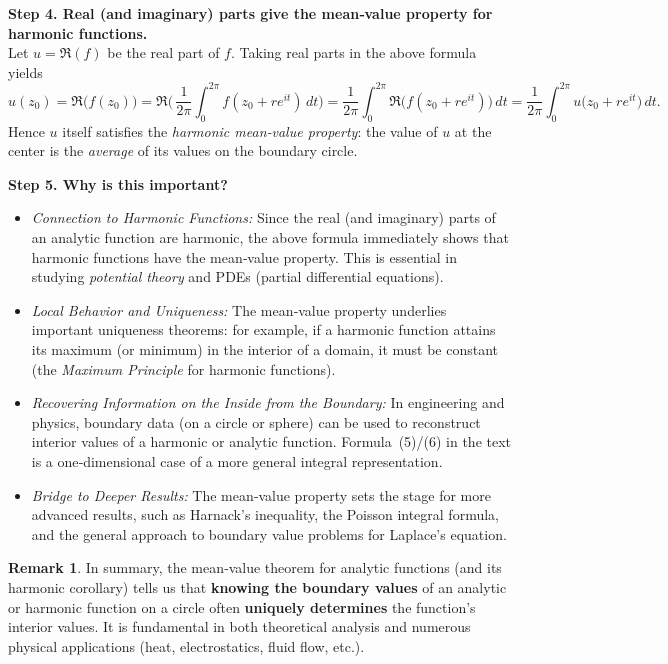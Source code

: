 \documentclass[12pt]{article}
\theoremstyle{definition} %
\newtheorem{remark}{Remark}
\theoremstyle{plain} %
\begin{document}
    \medskip
    
    \noindent
    \textbf{Step 4. Real (and imaginary) parts give the mean‐value property for harmonic functions.}\\
    Let $u = \Re(f)$ be the real part of $f$.  Taking real parts in the above formula yields
    \[
      u(z_0)
      = \Re\bigl(f(z_0)\bigr)
      = \Re\!\biggl(\,\frac{1}{2\pi}\int_{0}^{2\pi} f(z_0 + re^{i t})\, dt\biggr)
      = \frac{1}{2\pi}\int_{0}^{2\pi}
          \Re\bigl(f(z_0 + re^{i t})\bigr)\, dt
      = \frac{1}{2\pi}\int_{0}^{2\pi} u\bigl(z_0 + re^{i t}\bigr)\, dt.
    \]
    Hence $u$ itself satisfies the \emph{harmonic mean‐value property}: 
    the value of $u$ at the center is the \emph{average} of its values on the boundary circle.
    
    \medskip
    
    \noindent
    \textbf{Step 5. Why is this important?}
    \begin{itemize}
    \item \emph{Connection to Harmonic Functions:} 
      Since the real (and imaginary) parts of an analytic function are harmonic, the above formula 
      immediately shows that harmonic functions have the mean‐value property.  This is essential 
      in studying \emph{potential theory} and PDEs (partial differential equations).
    \item \emph{Local Behavior and Uniqueness:} 
      The mean‐value property underlies important uniqueness theorems: for example, if a harmonic 
      function attains its maximum (or minimum) in the interior of a domain, it must be constant 
      (the \emph{Maximum Principle} for harmonic functions).
    \item \emph{Recovering Information on the Inside from the Boundary:} 
      In engineering and physics, boundary data (on a circle or sphere) can be used to reconstruct 
      interior values of a harmonic or analytic function.  Formula~(5)/(6) in the text is a 
      one‐dimensional case of a more general integral representation.
    \item \emph{Bridge to Deeper Results:} 
      The mean‐value property sets the stage for more advanced results, such as Harnack's inequality, 
      the Poisson integral formula, and the general approach to boundary value problems for Laplace's equation.
    \end{itemize}
    
    \bigskip
    
    \begin{remark}
    In summary, the mean‐value theorem for analytic functions (and its harmonic corollary) tells us 
    that \textbf{knowing the boundary values} of an analytic or harmonic function on a circle often 
    \textbf{uniquely determines} the function’s interior values. It is fundamental in both theoretical 
    analysis and numerous physical applications (heat, electrostatics, fluid flow, etc.).
    \end{remark}    
\end{document}
